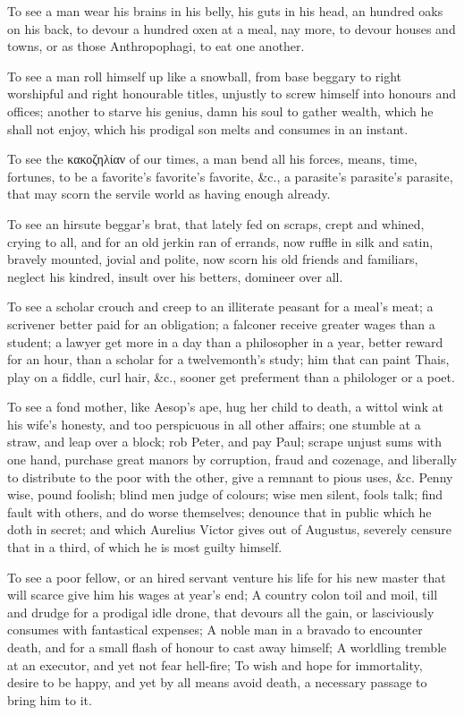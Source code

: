 {To see a man wear his brains in his belly, his guts in his head,
an hundred oaks on his back, to devour a hundred oxen at a meal, nay
more, to devour houses and towns, or as those Anthropophagi, to
eat one another.

To see a man roll himself up like a snowball, from base beggary to
right worshipful and right honourable titles, unjustly to screw himself
into honours and offices; another to starve his genius, damn his soul
to gather wealth, which he shall not enjoy, which his prodigal son
melts and consumes in an instant. 

To see the κακοζηλίαν of our times, a man bend all his forces, means,
time, fortunes, to be a favorite's favorite's favorite, \&c., a
parasite's parasite's parasite, that may scorn the servile world as
having enough already.

To see an hirsute beggar's brat, that lately fed on scraps, crept and
whined, crying to all, and for an old jerkin ran of errands, now ruffle
in silk and satin, bravely mounted, jovial and polite, now scorn his
old friends and familiars, neglect his kindred, insult over his
betters, domineer over all.

To see a scholar crouch and creep to an illiterate peasant for a meal's
meat; a scrivener better paid for an obligation; a falconer receive
greater wages than a student; a lawyer get more in a day than a
philosopher in a year, better reward for an hour, than a scholar for a
twelvemonth's study; him that can paint Thais, play on a fiddle,
curl hair, \&c., sooner get preferment than a philologer or a poet.

To see a fond mother, like Aesop's ape, hug her child to death, a 
wittol wink at his wife's honesty, and too perspicuous in all other
affairs; one stumble at a straw, and leap over a block; rob Peter, and
pay Paul; scrape unjust sums with one hand, purchase great manors by
corruption, fraud and cozenage, and liberally to distribute to the poor
with the other, give a remnant to pious uses, \&c. Penny wise, pound
foolish; blind men judge of colours; wise men silent, fools talk; 
find fault with others, and do worse themselves; denounce that in
public which he doth in secret; and which Aurelius Victor gives out of
Augustus, severely censure that in a third, of which he is most guilty
himself.

To see a poor fellow, or an hired servant venture his life for his new
master that will scarce give him his wages at year's end; A country
colon toil and moil, till and drudge for a prodigal idle drone, that
devours all the gain, or lasciviously consumes with fantastical
expenses; A noble man in a bravado to encounter death, and for a small
flash of honour to cast away himself; A worldling tremble at an
executor, and yet not fear hell-fire; To wish and hope for immortality,
desire to be happy, and yet by all means avoid death, a necessary
passage to bring him to it.

}
